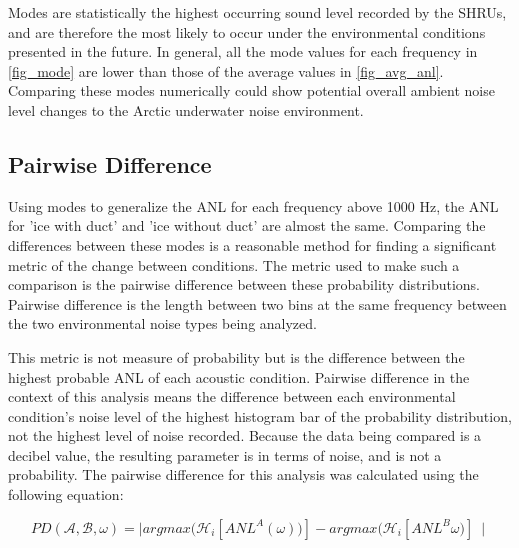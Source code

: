 Modes are statistically the highest occurring sound level recorded by the SHRUs, and are therefore the most likely to occur under the environmental conditions presented in the future. In general, all the mode values for each frequency in \autoref{fig_mode} are lower than those of the average values in \autoref{fig_avg_anl}. Comparing these modes numerically could show potential overall ambient noise level changes to the Arctic underwater noise environment.  


\subsection{Pairwise Difference} \label{sec_pairdiff}

Using modes to generalize the ANL for each frequency above 1000 Hz, the ANL for 'ice with duct' and 'ice without duct' are almost the same. Comparing the differences between these modes is a reasonable method for finding a significant metric of the change between conditions. The metric used to make such a comparison is the pairwise difference between these probability distributions. Pairwise difference is the length between two bins at the same frequency between the two environmental noise types being analyzed. 

This metric is not measure of probability but is the difference between the highest probable ANL of each acoustic condition. Pairwise difference in the context of this analysis means the difference between each environmental condition's noise level of the highest histogram bar of the probability distribution, not the highest level of noise recorded. Because the data being compared is a decibel value, the resulting parameter is in terms of noise, and is not a probability. The pairwise difference for this analysis was calculated using the following equation:

\begin{equation}
PD(\mathcal{A},\mathcal{B},\omega)=\mid argmax(\mathcal{H}_{i} [ANL ^{A}(\omega))]-argmax(\mathcal{H}_{i} [ANL^{B}\omega)]\ \mid 	%
\end{equation}

